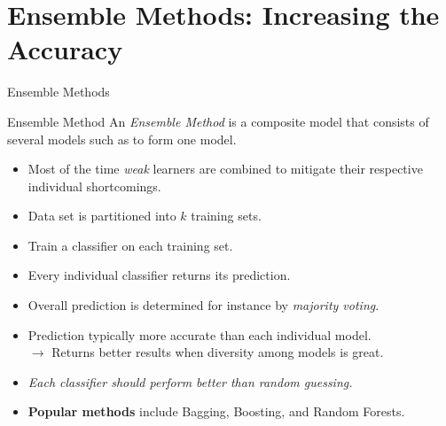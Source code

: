 \section{Ensemble Methods: Increasing the Accuracy}

\begin{frame}{Ensemble Methods}
	\begin{block}{Ensemble Method}
		An \textit{Ensemble Method} is a composite model that consists of several models such as to form one model.
	\end{block}
	\begin{itemize}
		\item Most of the time \textit{weak} learners are combined to mitigate their respective individual shortcomings.
		\item Data set is partitioned into $k$ training sets.
		\item Train a classifier on each training set.
		\item Every individual classifier returns its prediction.
		\item Overall prediction is determined for instance by \textit{majority voting}.
		\item Prediction typically more accurate than each individual model.\\
		      $\rightarrow$ Returns better results when diversity among models is great.
		\item \textit{Each classifier should perform better than random guessing.}
		\item \textbf{Popular methods} include Bagging, Boosting, and Random Forests.
	\end{itemize}
\end{frame}

